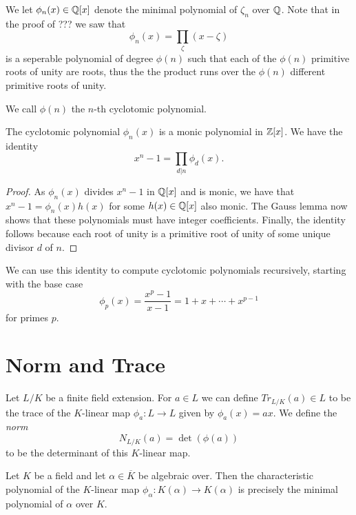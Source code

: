 \documentclass[twoside, a4paper, 10pt]{amsart}
\begin{document}
We let $\phi_n(x) \in \mathbb{Q}[x]$ denote the minimal polynomial of $\zeta_n$ over $\mathbb{Q}$. Note that in the proof of ??? we saw that $$\phi_n (x) = \prod_{\zeta} (x - \zeta)$$ is a seperable polynomial of degree $\phi(n)$ such that each of the $\phi(n)$ primitive roots of unity are roots, thus the the product runs over the $\phi(n)$ different primitive roots of unity.

\begin{mydef} We call $\phi(n)$ the $n$-th cyclotomic polynomial.

\end{mydef}

\begin{prop} The cyclotomic polynomial $\phi_n(x)$ is a monic polynomial in $\mathbb{Z}[x]$. We have the identity $$x^n - 1 = \prod_{d|n} \phi_d(x).$$

\end{prop}

\begin{proof} As $\phi_n(x)$ divides $x^n - 1$ in $\mathbb{Q}[x]$ and is monic, we have that $x^n-1 = \phi_n(x) h(x)$ for some $h(x) \in \mathbb{Q}[x]$ also monic. The Gauss lemma now shows that these polynomials must have integer coefficients. Finally, the identity follows because each root of unity is a primitive root of unity of some unique divisor $d$ of $n$. \end{proof}

We can use this identity to compute cyclotomic polynomials recursively, starting with the base case $$\phi_p(x) = \frac{x^p - 1}{x-1} = 1 + x + \cdots + x^{p-1}$$ for primes $p$.

\section{Norm and Trace}

Let $L/K$ be a finite field extension. For $a \in L$ we can define $Tr_{L/K}(a) \in L$ to be the trace of the $K$-linear map $\phi_a:L \to L$ given by $\phi_a(x) = ax$. We define the \textit{norm} $$N_{L/K}(a) = \operatorname{det}(\phi(a))$$  to be the determinant of this $K$-linear map. 

\begin{prop} Let $K$ be a field and let $\alpha \in \overline{K}$ be algebraic over. Then the characteristic polynomial of the $K$-linear map $\phi_{\alpha}:K(\alpha) \to K(\alpha)$ is precisely the minimal polynomial of $\alpha$ over $K$.

\end{prop}
\end{document}
